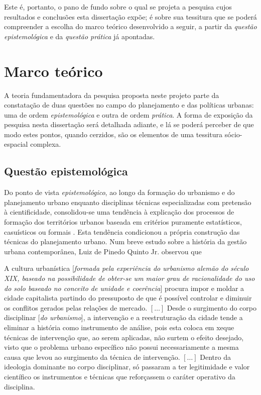 Este é, portanto, o pano de fundo sobre o qual se projeta a pesquisa cujos resultados e conclusões esta dissertação expõe; é sobre sua tessitura que se poderá compreender a escolha do marco teórico desenvolvido a seguir, a partir da \textit{questão epistemológica} e da \textit{questão prática} já apontadas.

\section[Marco teórico]{Marco teórico}\label{sec:marcteor}

A teoria fundamentadora da pesquisa proposta neste projeto parte da constatação de duas questões no campo do planejamento e das políticas urbanas: uma de ordem \textit{epistemológica} e outra de ordem \textit{prática}. A forma de exposição da pesquisa nesta dissertação será detalhada adiante, e lá se poderá perceber de que modo estes pontos, quando cerzidos, são os elementos de uma tessitura sócio-espacial complexa.

\subsection[Questão epistemológica]{Questão epistemológica}
\label{subsec:questepist}

Do ponto de vista \textit{epistemológico}, ao longo da formação do urbanismo e do planejamento urbano enquanto disciplinas técnicas especializadas com pretensão à cientificidade, consolidou-se uma tendência à explicação dos processos de formação dos territórios urbanos baseada em critérios puramente estatísticos, casuísticos ou formais \cite{benevolo_historia_1983, mumford_cidade_1998, hall_cidades_2007}. Esta tendência condicionou a própria construção das técnicas do planejamento urbano. Num breve estudo sobre a história da gestão urbana contemporânea, Luiz de Pinedo Quinto Jr. observou que 

\begin{citacao}
A cultura urbanística [\textit{formada pela experiência do urbanismo alemão do século XIX, baseado na possibilidade de obter-se um maior grau de racionalidade do uso do solo baseado no conceito de unidade e coerência}] procura impor e moldar a cidade capitalista partindo do pressuposto de que é possível controlar e diminuir os conflitos gerados pelas relações de mercado. \([\dots]\) Desde o surgimento do corpo disciplinar [\textit{do urbanismo}], a intervenção e a reestruturação da cidade tende a eliminar a história como instrumento de análise, pois esta coloca em xeque técnicas de intervenção que, ao serem aplicadas, não surtem o efeito desejado, visto que o problema urbano específico não possui necessariamente a mesma causa que levou ao surgimento da técnica de intervenção. \([\dots]\) Dentro da ideologia dominante no corpo disciplinar, só passaram a ter legitimidade e valor científico os instrumentos e técnicas que reforçassem o caráter operativo da disciplina. \cite{QUINTOJR1990}
\end{citacao}

